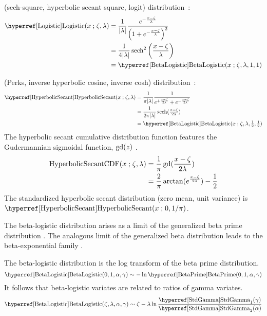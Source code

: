  (sech-square, hyperbolic secant square, logit) distribution~\cite{Verhulst1845, Balakrishnan1991, Johnson1995}:
\begin{align}
\label{Logistic}
\opr{Logistic}(x\given \pLoc,\pScale) 
& =
 \frac{1}{ \left| \pScale\right|}
 \frac{e^{-\frac{x-\pLoc}{\pScale} }} { \left(1 + e^{-\frac{x-\pLoc}{\pScale}  }\right)^{2} }	\checked
 \\ \notag & = \frac{1}{4 |\pScale|} \op{sech}^2 \left(\frac{x-\pLoc}{\pScale}  \right)  \checked
 \\ \notag & = \opr{BetaLogistic}(x\given \pLoc,\pScale,1,1)	\checked
\end{align}





 (Perks, inverse hyperbolic cosine, inverse cosh) distribution~\cite{Perks1932,Talacko1956, Johnson1995}:
\begin{align}
\label{HyperbolicSecant}
\opr{HyperbolicSecant}(x\given \pLoc, \pScale) 
& =
\frac{1}{\pi |\pScale|}
 \frac{1}{e^{+\sfrac{x-\pLoc}{2\pScale}} + e^{- \sfrac{x-\pLoc}{2\pScale} }} \checked
 \\ & = \frac{1}{2 \pi  |\pScale|} \op{sech}(\sfrac{x-\pLoc}{2\lambda}) \notag \checked
 \\ \notag & = \opr{BetaLogistic}(x\given  \pLoc, \pScale,\tfrac{1}{2},\tfrac{1}{2}) \checked
\end{align}
The hyperbolic secant cumulative distribution function features the Gudermannian sigmoidal function, $\operatorname{gd}(z)$ . 
\begin{align*}
\operatorname{HyperbolicSecantCDF}(x\mathrel{;} \zeta, \lambda)  & = \frac{1}{\pi}\operatorname{gd}(\frac{x-\zeta}{2 \lambda})  \\
& =  \frac{2}{\pi} \arctan(e^\frac{x-\zeta}{2\lambda}) - \frac{1}{2} 
\end{align*}
The standardized hyperbolic secant distribution (zero mean, unit variance) is $\opr{HyperbolicSecant}(x\given 0, 1/\pi)\checked$.





The beta-logistic distribution arises as a limit of the generalized beta prime distribution . The analogous limit of the generalized beta distribution leads to the beta-exponential family . 


The beta-logistic distribution is the log transform of the beta prime distribution. 
\[
 \opr{BetaLogistic}(0,1,\alpha,\gamma)  \sim - \ln \opr{BetaPrime}(0,1,\alpha,\gamma)  \checked
 \notag
\] 
It follows that beta-logistic variates are related to ratios of gamma variates.
\[
\opr{BetaLogistic}(\pLoc,\pScale,\alpha,\gamma)  \sim \pLoc - \pScale \ln  \frac{\opr{StdGamma}_1(\gamma)}{\opr{StdGamma}_2(\alpha) }
\notag
\checked
\]


